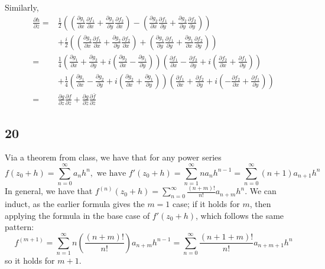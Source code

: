 \documentclass[12pt,letterpaper]{article}
\theoremstyle{definition}
\begin{document}
Similarly,
\begin{align*}
  \frac{\partial h}{\partial \bar{z}} =& \frac{1}{2}\left(\left(\frac{\partial g_{1}}{\partial x}\frac{\partial f_{1}}{\partial x} + \frac{\partial g_{1}}{\partial y}\frac{\partial f_{2}}{\partial x}\right) - \left(\frac{\partial g_{2}}{\partial x}\frac{\partial f_{1}}{\partial y} + \frac{\partial g_{2}}{\partial y}\frac{\partial f_{2}}{\partial y}\right)\right) \\
  &+ \frac{i}{2}\left(\left(\frac{\partial g_{2}}{\partial x}\frac{\partial f_{1}}{\partial x} + \frac{\partial g_{2}}{\partial y}\frac{\partial f_{2}}{\partial x}\right) + \left(\frac{\partial g_{1}}{\partial y}\frac{\partial f_{1}}{\partial y} + \frac{\partial g_{1}}{\partial x}\frac{\partial f_{2}}{\partial y}\right)\right) \\
  =& \frac{1}{4}\left(\frac{\partial g_{1}}{\partial x} + \frac{\partial g_{2}}{\partial y} + i\left(\frac{\partial g_{2}}{\partial x} - \frac{\partial g_{1}}{\partial y}\right)\right)\left(\frac{\partial f_{1}}{\partial x} - \frac{\partial f_{2}}{\partial y} + i\left(\frac{\partial f_{2}}{\partial x} + \frac{\partial f_{1}}{\partial y}\right)\right) \\
  &+ \frac{1}{4}\left(\frac{\partial g_{1}}{\partial x} - \frac{\partial g_{2}}{\partial y} + i\left(\frac{\partial g_{2}}{\partial x} + \frac{\partial g_{1}}{\partial y}\right)\right)\left(\frac{\partial f_{1}}{\partial x} + \frac{\partial f_{2}}{\partial y} + i\left(-\frac{\partial f_{2}}{\partial x} + \frac{\partial f_{1}}{\partial y}\right)\right) \\
  =& \frac{\partial g}{\partial z}\frac{\partial f}{\partial \bar{z}} + \frac{\partial g}{\partial \bar{z}}\frac{\partial \bar{f}}{\partial \bar{z}}
\end{align*}

\subsection*{20}

Via a theorem from class, we have that for any power series
\[
  f(z_{0} + h) = \sum_{n=0}^{\infty}a_{n}h^{n}, \text{ we have } f'(z_{0}+h) = \sum_{n=1}^{\infty}na_{n}h^{n-1} = \sum_{n=0}^{\infty} (n+1)a_{n+1}h^{n}
\]
In general, we have that $f^{(n)}(z_{0}+h) = \sum_{n=0}^{\infty}\frac{(n+m)!}{n!}a_{n+m}h^{n}$. We can induct, as the earlier formula gives the $m = 1$ case; if it holds for $m$, then applying the formula in the base case of $f'(z_{0} + h)$, which follows the same pattern:
\[
  f^{(m+1)} = \sum_{n=1}^{\infty}n\left(\frac{(n+m)!}{n!}\right)a_{n+m}h^{n-1} = \sum_{n=0}^{\infty}\frac{(n+1+m)!}{n!}a_{n+m+1}h^{n}
\]
so it holds for $m+1$.
\end{document}
